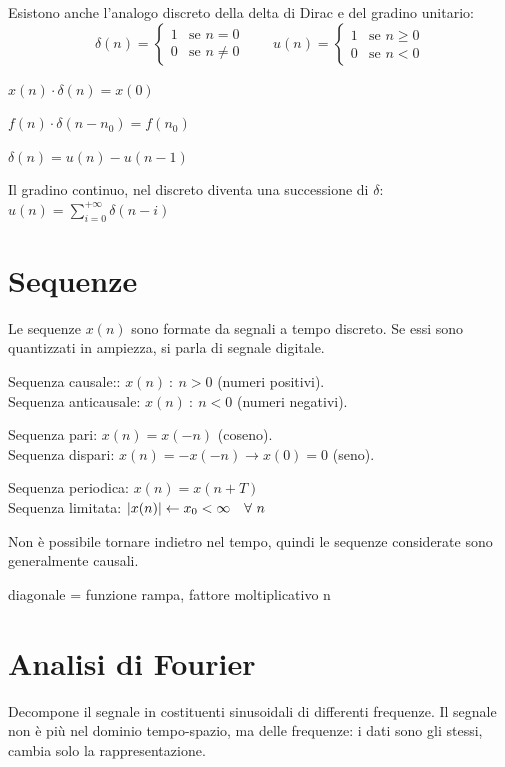 Esistono anche l'analogo discreto della delta di Dirac e del gradino unitario:
$$\delta(n) = \begin{cases}
1 & \text{se } n = 0 \\
0 & \text{se } n \neq 0
\end{cases}
\qquad
u(n) = \begin{cases}
1 & \text{se } n \geq 0 \\
0 & \text{se } n < 0
\end{cases}$$

$x(n) \cdot \delta(n) = x(0) $ 

$f(n) \cdot \delta(n - n_0) = f(n_0)$ 

$\delta(n) = u(n) - u(n - 1)$

Il gradino continuo, nel discreto diventa una successione di $\delta$: $u(n) = \sum_{i=0}^{+\infty} \delta(n - i)$ 

\section{Sequenze}
Le sequenze $x(n)$ sono formate da segnali a tempo discreto. Se essi sono quantizzati in ampiezza, si parla di segnale digitale. 

Sequenza causale:: $x(n)\ :\ n > 0$ (numeri positivi). \\
Sequenza anticausale: $x(n)\ :\ n < 0$ (numeri negativi).

Sequenza pari: $x(n) = x(-n)$ (coseno). \\
Sequenza dispari: $x(n) = -x(-n) \rightarrow x(0) = 0$ (seno).

Sequenza periodica: $x(n) = x(n + T)$ \\
Sequenza limitata: $\left|x(n)\right| \leftarrow x_0 < \infty \quad \forall\ n$

Non è possibile tornare indietro nel tempo, quindi le sequenze considerate sono generalmente causali. 

diagonale = funzione rampa, fattore moltiplicativo n

\section{Analisi di Fourier}
Decompone il segnale in costituenti sinusoidali di differenti frequenze. Il segnale non è più nel dominio tempo-spazio, ma delle frequenze: i dati sono gli stessi, cambia solo la rappresentazione.

 








